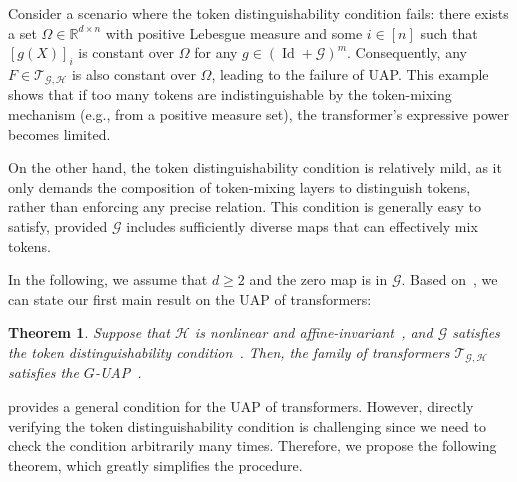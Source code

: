 \documentclass{article}
\newtheorem{theorem}{Theorem}
\newcommand{\ql}[1]{{\footnotesize\textcolor{red}{QL: #1}}}
\begin{document}
Consider a scenario where the token distinguishability condition fails: there exists a set $\Omega\in\mathbb R^{d\times n}$ with positive Lebesgue measure and some $i\in [n]$ such that $[g(X)]_i$ is constant over $\Omega$ for any $g\in (\operatorname{Id}+\mathcal G)^m$. Consequently, any $F\in\mathcal T_{\mathcal G,\mathcal H}$ is also constant over $\Omega$, leading to the failure of UAP. This example shows that if too many tokens are indistinguishable by the token-mixing mechanism (e.g., from a positive measure set), the transformer's expressive power becomes limited.

On the other hand, the token distinguishability condition is relatively mild, as it only demands the composition of token-mixing layers to distinguish tokens, rather than enforcing any precise relation. This condition is generally easy to satisfy, provided $\mathcal G$ includes sufficiently diverse maps that can effectively mix tokens.

In the following, we assume that $d\ge 2$ and the zero map is in $\mathcal G$. 
Based on~,
we can state our first main result on the UAP of transformers:
\begin{theorem}
    \label{thm:main}
    Suppose that $\mathcal H$ is nonlinear and affine-invariant~, and $\mathcal G$ satisfies the token distinguishability condition~. Then, the family of transformers $\mathcal{T}_{\mathcal{G}, \mathcal{H}}$ satisfies the $G$-UAP~.
\end{theorem}

 provides a general condition for the UAP of transformers. However, directly verifying the token distinguishability condition is challenging since 
we need to check the condition arbitrarily many times.
Therefore, we propose the following theorem, which greatly simplifies the procedure. 
\end{document}
